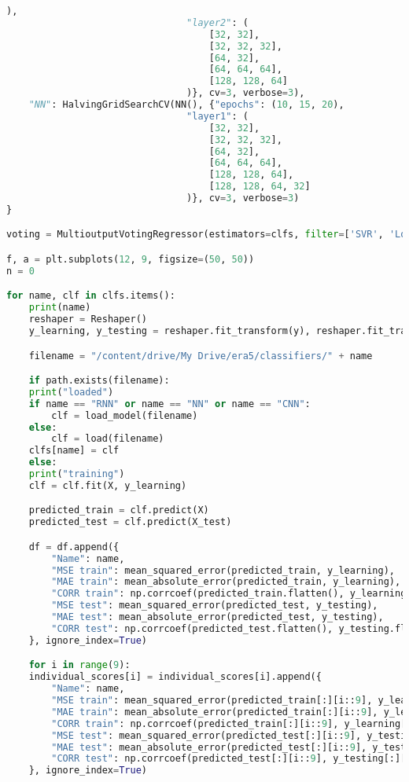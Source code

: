 \begin{lstlisting}[label=python-listing,caption={Kod źródłowy},language=python]
                                ), 
                                "layer2": (
                                    [32, 32],
                                    [32, 32, 32],
                                    [64, 32],
                                    [64, 64, 64],
                                    [128, 128, 64]
                                )}, cv=3, verbose=3),
    "NN": HalvingGridSearchCV(NN(), {"epochs": (10, 15, 20), 
                                "layer1": (
                                    [32, 32],
                                    [32, 32, 32],
                                    [64, 32],
                                    [64, 64, 64],
                                    [128, 128, 64],
                                    [128, 128, 64, 32]
                                )}, cv=3, verbose=3)
}

voting = MultioutputVotingRegressor(estimators=clfs, filter=['SVR', 'Logistic Regression', 'SGD', 'PLS', 'Random Forest', 'MLP', 'RNN', 'CNN', 'NN'])

f, a = plt.subplots(12, 9, figsize=(50, 50))
n = 0

for name, clf in clfs.items():
    print(name)
    reshaper = Reshaper()
    y_learning, y_testing = reshaper.fit_transform(y), reshaper.fit_transform(y_test)

    filename = "/content/drive/My Drive/era5/classifiers/" + name

    if path.exists(filename):
    print("loaded")
    if name == "RNN" or name == "NN" or name == "CNN":
        clf = load_model(filename)
    else:
        clf = load(filename)
    clfs[name] = clf
    else:
    print("training")
    clf = clf.fit(X, y_learning)

    predicted_train = clf.predict(X)
    predicted_test = clf.predict(X_test)

    df = df.append({
        "Name": name,
        "MSE train": mean_squared_error(predicted_train, y_learning),
        "MAE train": mean_absolute_error(predicted_train, y_learning),
        "CORR train": np.corrcoef(predicted_train.flatten(), y_learning.flatten())[0][1],
        "MSE test": mean_squared_error(predicted_test, y_testing),
        "MAE test": mean_absolute_error(predicted_test, y_testing),
        "CORR test": np.corrcoef(predicted_test.flatten(), y_testing.flatten())[0][1]
    }, ignore_index=True)

    for i in range(9):
    individual_scores[i] = individual_scores[i].append({
        "Name": name,
        "MSE train": mean_squared_error(predicted_train[:][i::9], y_learning[:][i::9]),
        "MAE train": mean_absolute_error(predicted_train[:][i::9], y_learning[:][i::9]),
        "CORR train": np.corrcoef(predicted_train[:][i::9], y_learning[:][i::9]),
        "MSE test": mean_squared_error(predicted_test[:][i::9], y_testing[:][i::9]),
        "MAE test": mean_absolute_error(predicted_test[:][i::9], y_testing[:][i::9]),
        "CORR test": np.corrcoef(predicted_test[:][i::9], y_testing[:][i::9]),
    }, ignore_index=True)


\end{lstlisting}
